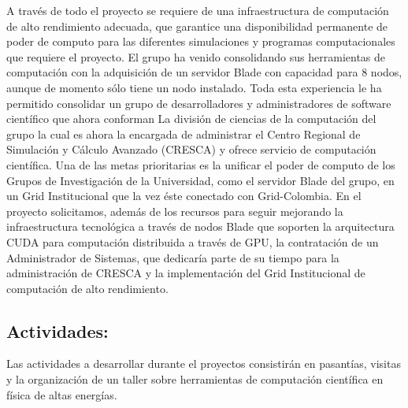 A través de todo el proyecto se requiere de una infraestructura de
computación de alto rendimiento adecuada, que garantice una
disponibilidad permanente de poder de computo para las diferentes
simulaciones y programas computacionales que requiere el proyecto. El
grupo ha venido consolidando sus herramientas de computación con la
adquisición de un servidor Blade con capacidad para 8 nodos, aunque de
momento sólo tiene un nodo instalado. Toda esta experiencia le ha
permitido consolidar un grupo de desarrolladores y administradores de
software científico que ahora conforman La división de ciencias de la
computación del grupo la cual es ahora la encargada de administrar el
Centro Regional de Simulación y Cálculo Avanzado (CRESCA) y ofrece
servicio de computación científica.  Una de las metas prioritarias es
la unificar el poder de computo de los Grupos de Investigación de la
Universidad, como el servidor Blade del grupo, en un Grid
Institucional que la vez éste conectado con Grid-Colombia. En el
proyecto solicitamos, además de los recursos para seguir mejorando la
infraestructura tecnológica a través de nodos Blade que soporten la
arquitectura CUDA para computación distribuida a través de GPU, la
contratación de un Administrador de Sistemas, que dedicaría parte de
su tiempo para la administración de CRESCA y la implementación del
Grid Institucional de computación de alto rendimiento.



\subsection{Actividades:                                   }
Las actividades a desarrollar durante el proyectos consistirán en
pasantías, visitas y la organización de un taller sobre herramientas de
computación científica en física de altas energías.

